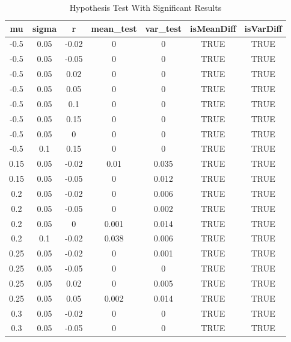 \documentclass[
10pt, %
a4paper, %
oneside, %
headinclude,footinclude, %
BCOR5mm, %
]{scrartcl}
\begin{document}
\begin{table}[H]
	\centering
	\caption{Hypothesis Test With Significant Results}
	\label{my-label}
	\begin{tabular}{|c|c|c|c|c|c|c|}
		\hline
		mu    & sigma & r     & mean\_test & var\_test & isMeanDiff & isVarDiff \\
		\hline
		-0.5  & 0.05  & -0.02 & 0          & 0         & TRUE       & TRUE      \\
		-0.5  & 0.05  & -0.05 & 0          & 0         & TRUE       & TRUE      \\
		-0.5  & 0.05  & 0.02  & 0          & 0         & TRUE       & TRUE      \\
		-0.5  & 0.05  & 0.05  & 0          & 0         & TRUE       & TRUE      \\
		-0.5  & 0.05  & 0.1   & 0          & 0         & TRUE       & TRUE      \\
		-0.5  & 0.05  & 0.15  & 0          & 0         & TRUE       & TRUE      \\
		-0.5  & 0.05  & 0     & 0          & 0         & TRUE       & TRUE      \\
		-0.5  & 0.1   & 0.15  & 0          & 0         & TRUE       & TRUE      \\
		0.15  & 0.05  & -0.02 & 0.01       & 0.035     & TRUE       & TRUE      \\
		0.15  & 0.05  & -0.05 & 0          & 0.012     & TRUE       & TRUE      \\
		0.2   & 0.05  & -0.02 & 0          & 0.006     & TRUE       & TRUE      \\
		0.2   & 0.05  & -0.05 & 0          & 0.002     & TRUE       & TRUE      \\
		0.2   & 0.05  & 0     & 0.001      & 0.014     & TRUE       & TRUE      \\
		0.2   & 0.1   & -0.02 & 0.038      & 0.006     & TRUE       & TRUE      \\
		0.25  & 0.05  & -0.02 & 0          & 0.001     & TRUE       & TRUE      \\
		0.25  & 0.05  & -0.05 & 0          & 0         & TRUE       & TRUE      \\
		0.25  & 0.05  & 0.02  & 0          & 0.005     & TRUE       & TRUE      \\
		0.25  & 0.05  & 0.05  & 0.002      & 0.014     & TRUE       & TRUE      \\
		0.3   & 0.05  & -0.02 & 0          & 0         & TRUE       & TRUE      \\
		0.3   & 0.05  & -0.05 & 0          & 0         & TRUE       & TRUE      \\

\end{tabular}
\end{table}
\end{document}
